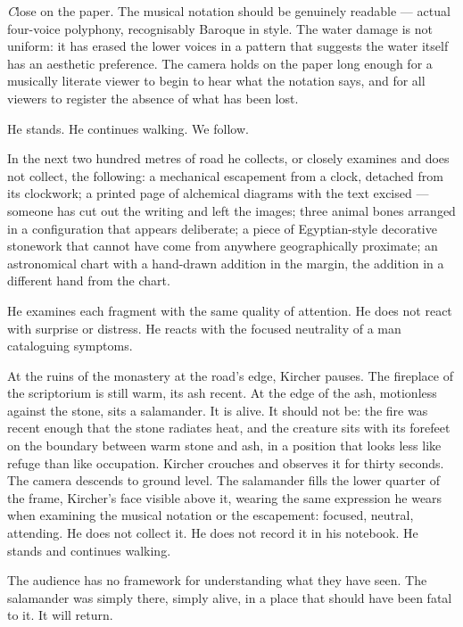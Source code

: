 \documentclass[12pt, a4paper, twoside]{memoir}
\theoremstyle{definition}
\theoremstyle{remark}
\newenvironment{action}{%
  \vspace{4pt}%
  \noindent\begin{minipage}{\linewidth}%
  \setlength{\parindent}{0pt}%
  \itshape\color{kircherink}%
}{%
  \end{minipage}\vspace{6pt}%
}
\newenvironment{visual}{%
  \vspace{6pt}%
  \noindent\begin{mdframed}[
    linecolor=plaguegrey,
    linewidth=0.4pt,
    leftline=true, rightline=false, topline=false, bottomline=false,
    innerleftmargin=8pt,
    innerrightmargin=0pt,
    innertopmargin=2pt,
    innerbottommargin=2pt,
    backgroundcolor=white
  ]%
  \footnotesize\color{plaguegrey}\textit
}{%
  \end{mdframed}\vspace{4pt}%
}
\newcommand{\salamander}[1]{%
  \marginnote{\color{arkgold!80}\scriptsize\bfseries[S\,#1]}%
}
\begin{document}
\begin{visual}
Close on the paper. The musical notation should be genuinely readable --- actual four-voice polyphony, recognisably Baroque in style. The water damage is not uniform: it has erased the lower voices in a pattern that suggests the water itself has an aesthetic preference. The camera holds on the paper long enough for a musically literate viewer to begin to hear what the notation says, and for all viewers to register the absence of what has been lost.
\end{visual}

\begin{action}
He stands. He continues walking. We follow.

In the next two hundred metres of road he collects, or closely examines and does not collect, the following: a mechanical escapement from a clock, detached from its clockwork; a printed page of alchemical diagrams with the text excised --- someone has cut out the writing and left the images; three animal bones arranged in a configuration that appears deliberate; a piece of Egyptian-style decorative stonework that cannot have come from anywhere geographically proximate; an astronomical chart with a hand-drawn addition in the margin, the addition in a different hand from the chart.

He examines each fragment with the same quality of attention. He does not react with surprise or distress. He reacts with the focused neutrality of a man cataloguing symptoms.
\end{action}

\begin{action}
\salamander{I} At the ruins of the monastery at the road's edge, Kircher pauses. The fireplace of the scriptorium is still warm, its ash recent. At the edge of the ash, motionless against the stone, sits a salamander. It is alive. It should not be: the fire was recent enough that the stone radiates heat, and the creature sits with its forefeet on the boundary between warm stone and ash, in a position that looks less like refuge than like occupation. Kircher crouches and observes it for thirty seconds. The camera descends to ground level. The salamander fills the lower quarter of the frame, Kircher's face visible above it, wearing the same expression he wears when examining the musical notation or the escapement: focused, neutral, attending. He does not collect it. He does not record it in his notebook. He stands and continues walking.

The audience has no framework for understanding what they have seen. The salamander was simply there, simply alive, in a place that should have been fatal to it. It will return.
\end{action}
\end{document}
